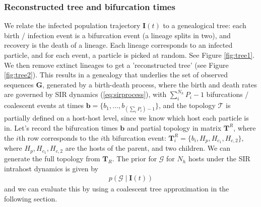 \documentclass[a4paper,18pt]{report}
\begin{document}
\subsubsection{Reconstructed tree and bifurcation times}
We relate the infected population trajectory $\mathbf{I}(t)$ to a genealogical tree: each birth / infection event is a bifurcation event (a lineage splits in two), and recovery is the death of a lineage. Each lineage corresponds to an infected particle, and for each event, a particle is picked at random.
See Figure \ref{fig:tree1}. We then remove extinct lineages to get a 'reconstructed tree' (see Figure \ref{fig:tree2}). This results in a genealogy that underlies the set of observed sequences  $\mathbf{G}$, generated by a birth-death process, where the birth and death rates are governed by SIR dynamics (\ref{eq:sirprocess}), with  $\sum_i^{N_h} P_i - 1$ bifurcations / coalescent events at times $\mathbf{b}=\{b_1,...,b_{(\sum_i P_i)-1}\}$, and the topology $\mathcal{T}$ is partially defined on a host-host level, since we know which host each particle is in. Let's record the bifurcation times $\mathbf{b}$ and partial topology in matrix $\mathbf{T}^R$, where the $i$th row corresponds to the $i$th bifurcation event: $\mathbf{T}^R_i=\{b_i, H_p, H_{c_1}, H_{c,2}\}$, where $H_p, H_{c_1}, H_{c,2}$ are the hosts of the parent, and two children. We can generate the full topology from $\mathbf{T}_R$. The prior for $\mathcal{G}$ for $N_h$ hosts under the SIR intrahost dynamics is given by 
\begin{eqnarray}
p(\mathcal{G}\mid \mathbf{I}(t)) \label{eq:ll1}
\end{eqnarray}
and we can evaluate this by using a coalescent tree approximation in the following section.
\end{document}
